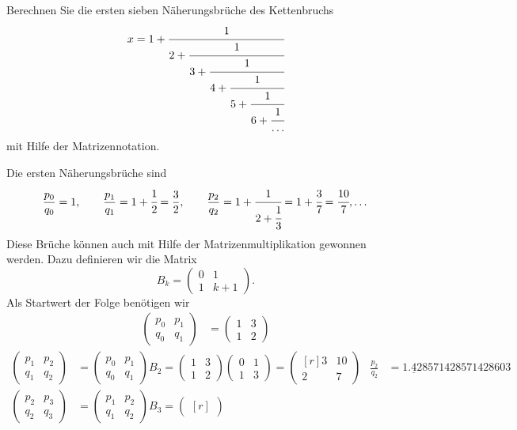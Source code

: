Berechnen Sie die ersten sieben Näherungsbrüche des Kettenbruchs
\[
x
=
1+\cfrac{1}{2+\cfrac{1}{3+\cfrac{1}{4+\cfrac{1}{5+\cfrac{1}{6+\cfrac{1}{\dots}}}}}}
\]
mit Hilfe der Matrizennotation.

\begin{loesung}
Die ersten Näherungsbrüche sind
\[
\frac{p_0}{q_0} = 1,\qquad
\frac{p_1}{q_1} = 1+\cfrac{1}{2} = \frac{3}{2},\qquad
\frac{p_2}{q_2} = 1 + \cfrac{1}{2+\cfrac{1}{3}} = 1+\cfrac{3}{7}=\cfrac{10}{7},\dots
\]
Diese Brüche können auch mit Hilfe der Matrizenmultiplikation gewonnen werden.
Dazu definieren wir die Matrix 
\[
B_k
=
\begin{pmatrix}
0&1\\
1&k+1
\end{pmatrix}
.
\]
Als Startwert der Folge benötigen wir
\begin{align*}
\begin{pmatrix}
p_0&p_1\\
q_0&q_1
\end{pmatrix}
&=
\begin{pmatrix}
1&3\\
1&2
\end{pmatrix}
\end{align*}
\begin{align*}
\begin{pmatrix}
p_1&p_2\\
q_1&q_2
\end{pmatrix}
&=
\begin{pmatrix}
p_0&p_1\\
q_0&q_1
\end{pmatrix}
B_2
=
\begin{pmatrix}
1&3\\
1&2
\end{pmatrix}
\begin{pmatrix}
0&1\\
1&3
\end{pmatrix}
=
\begin{pmatrix*}[r]
3&10\\
2& 7
\end{pmatrix*}
&
\frac{p_2}{q_2}
&=
1.\underline{4}28571428571428603
\\
\begin{pmatrix}
p_2&p_3\\
q_2&q_3
\end{pmatrix}
&=
\begin{pmatrix}
p_1&p_2\\
q_1&q_2
\end{pmatrix}
B_3
=
\begin{pmatrix*}[r]

\end{pmatrix*}
\end{align*}
\end{loesung}

